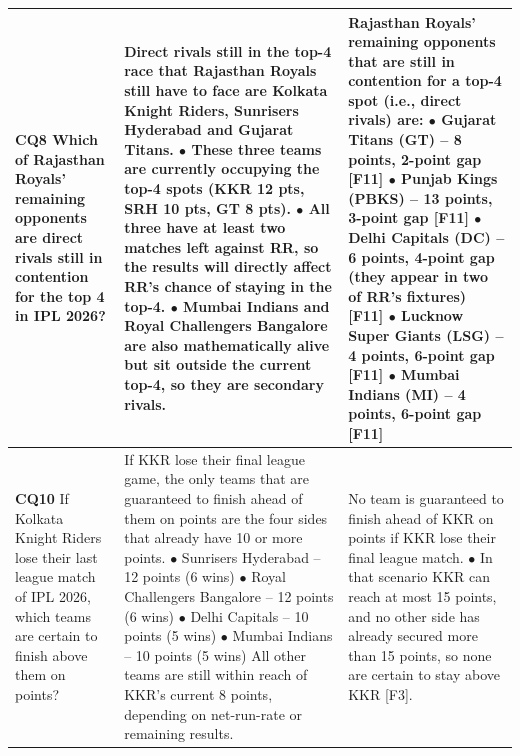 \begin{longtable}{p{1.9cm}p{6.8cm}p{6.8cm}}
\textbf{CQ8} \newline \scriptsize Which of Rajasthan Royals' remaining opponents are direct rivals still in contention for the top 4 in IPL 2026? & \scriptsize Direct rivals still in the top-4 race that Rajasthan Royals still have to face are Kolkata Knight Riders, Sunrisers Hyderabad and Gujarat Titans. \newline \quad$\bullet$ These three teams are currently occupying the top-4 spots (KKR 12 pts, SRH 10 pts, GT 8 pts). \newline \quad$\bullet$ All three have at least two matches left against RR, so the results will directly affect RR's chance of staying in the top-4. \newline \quad$\bullet$ Mumbai Indians and Royal Challengers Bangalore are also mathematically alive but sit outside the current top-4, so they are secondary rivals. & \scriptsize Rajasthan Royals' remaining opponents that are still in contention for a top-4 spot (i.e., direct rivals) are: \newline \quad$\bullet$ Gujarat Titans (GT) -- 8 points, 2-point gap \textsf{[F11]} \newline \quad$\bullet$ Punjab Kings (PBKS) -- 13 points, 3-point gap \textsf{[F11]} \newline \quad$\bullet$ Delhi Capitals (DC) -- 6 points, 4-point gap (they appear in two of RR's fixtures) \textsf{[F11]} \newline \quad$\bullet$ Lucknow Super Giants (LSG) -- 4 points, 6-point gap \textsf{[F11]} \newline \quad$\bullet$ Mumbai Indians (MI) -- 4 points, 6-point gap \textsf{[F11]} \\ \midrule
\textbf{CQ10} \newline \scriptsize If Kolkata Knight Riders lose their last league match of IPL 2026, which teams are certain to finish above them on points? & \scriptsize If KKR lose their final league game, the only teams that are guaranteed to finish ahead of them on points are the four sides that already have 10 or more points. \newline \quad$\bullet$ Sunrisers Hyderabad -- 12 points (6 wins) \newline \quad$\bullet$ Royal Challengers Bangalore -- 12 points (6 wins) \newline \quad$\bullet$ Delhi Capitals -- 10 points (5 wins) \newline \quad$\bullet$ Mumbai Indians -- 10 points (5 wins) \newline All other teams are still within reach of KKR's current 8 points, depending on net-run-rate or remaining results. & \scriptsize No team is guaranteed to finish ahead of KKR on points if KKR lose their final league match. \newline \quad$\bullet$ In that scenario KKR can reach at most 15 points, and no other side has already secured more than 15 points, so none are certain to stay above KKR \textsf{[F3]}. \\ \midrule

\end{longtable}
